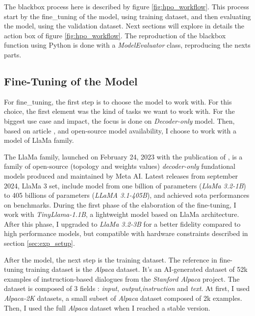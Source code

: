 The blackbox process here is described by figure \ref{fig:hpo_workflow}. This process start by the \gls{fine_tuning} of the model, using training dataset, and then evaluating the model, using the validation dataset. Next sections will explore in details the action box of figure \ref{fig:hpo_workflow}. The reproduction of the blackbox function using Python is done with a \textit{ModelEvaluator} class, reproducing the nexts parts.

\subsection{Fine-Tuning of the Model}
\label{sec:fine_tuning}

For \gls{fine_tuning}, the first step is to choose the model to work with. For this choice, the first element was the kind of tasks we want to work with. For the biggest use case and impact, the focus is done on \textit{Decoder-only} model. Then, based on article \cite{tribes_hyperparameter_2024}, and open-source model availability, I choose to work with a model of LlaMa family.

The LlaMa family, launched on February 24, 2023 with the publication of \cite{touvron_llama_2023}, is a family of open-source (topology and weights values) \textit{decoder-only} fundational models produced and maintained by Meta AI. Latest releases from september 2024, LlaMa 3\cite{grattafiori_llama_2024} set, include model from one billion of parameters (\textit{LlaMa 3.2-1B}) to 405 billions of parameters (\textit{LLaMA 3.1-405B}), and achieved \acrlong{sota} performances on benchmarks. During the first phase of the elaboration of the fine-tuning, I work with \textit{TinyLlama-1.1B}, a lightweight model based on LlaMa architecture. After this phase, I upgraded to \textit{LlaMa 3.2-3B} for a better fidelity compared to high performance models, but compatible with hardware constraints described in section \ref{sec:exp_setup}.

After the model, the next step is the training dataset. The reference in fine-tuning training dataset is the \textit{Alpaca} dataset\cite{hashimoto_stanford_2024}. It's an AI-generated dataset of 52k examples of instruction-based dialogues from the \textit{Stanford Alpaca} project. The dataset is composed of 3 fields : \textit{input}, \textit{output},\textit{instruction} and \textit{text}. At first, I used \textit{Alpaca-2K} datasets, a small subset of \textit{Alpaca} dataset composed of 2k examples. Then, I used the full \textit{Alpaca} dataset when I reached a stable version. 

